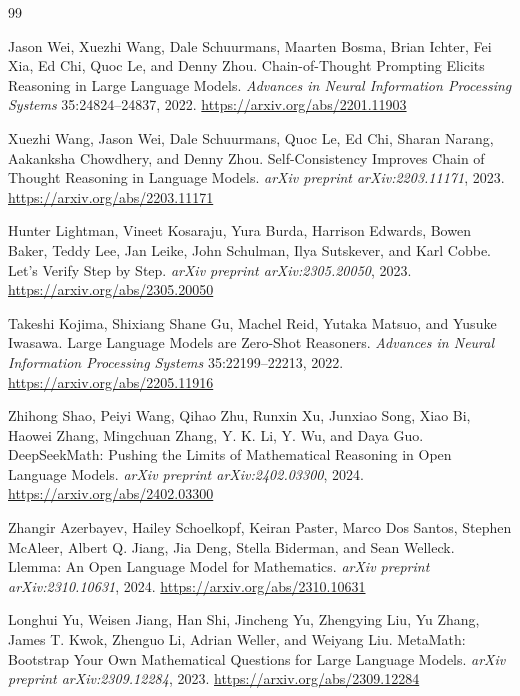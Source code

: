 \begin{thebibliography}{99}

Jason Wei, Xuezhi Wang, Dale Schuurmans, Maarten Bosma, Brian Ichter, Fei Xia, Ed Chi, Quoc Le, and Denny Zhou. Chain-of-Thought Prompting Elicits Reasoning in Large Language Models. \emph{Advances in Neural Information Processing Systems} 35:24824--24837, 2022. \url{https://arxiv.org/abs/2201.11903}

Xuezhi Wang, Jason Wei, Dale Schuurmans, Quoc Le, Ed Chi, Sharan Narang, Aakanksha Chowdhery, and Denny Zhou. Self-Consistency Improves Chain of Thought Reasoning in Language Models. \emph{arXiv preprint arXiv:2203.11171}, 2023. \url{https://arxiv.org/abs/2203.11171}

Hunter Lightman, Vineet Kosaraju, Yura Burda, Harrison Edwards, Bowen Baker, Teddy Lee, Jan Leike, John Schulman, Ilya Sutskever, and Karl Cobbe. Let's Verify Step by Step. \emph{arXiv preprint arXiv:2305.20050}, 2023. \url{https://arxiv.org/abs/2305.20050}

Takeshi Kojima, Shixiang Shane Gu, Machel Reid, Yutaka Matsuo, and Yusuke Iwasawa. Large Language Models are Zero-Shot Reasoners. \emph{Advances in Neural Information Processing Systems} 35:22199--22213, 2022. \url{https://arxiv.org/abs/2205.11916}

Zhihong Shao, Peiyi Wang, Qihao Zhu, Runxin Xu, Junxiao Song, Xiao Bi, Haowei Zhang, Mingchuan Zhang, Y. K. Li, Y. Wu, and Daya Guo. {DeepSeekMath}: Pushing the Limits of Mathematical Reasoning in Open Language Models. \emph{arXiv preprint arXiv:2402.03300}, 2024. \url{https://arxiv.org/abs/2402.03300}

Zhangir Azerbayev, Hailey Schoelkopf, Keiran Paster, Marco Dos Santos, Stephen McAleer, Albert Q. Jiang, Jia Deng, Stella Biderman, and Sean Welleck. {Llemma}: An Open Language Model for Mathematics. \emph{arXiv preprint arXiv:2310.10631}, 2024. \url{https://arxiv.org/abs/2310.10631}

Longhui Yu, Weisen Jiang, Han Shi, Jincheng Yu, Zhengying Liu, Yu Zhang, James T. Kwok, Zhenguo Li, Adrian Weller, and Weiyang Liu. {MetaMath}: Bootstrap Your Own Mathematical Questions for Large Language Models. \emph{arXiv preprint arXiv:2309.12284}, 2023. \url{https://arxiv.org/abs/2309.12284}


\end{thebibliography}
